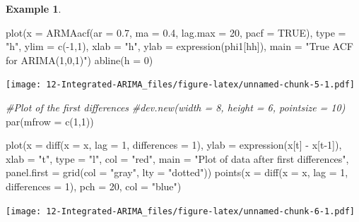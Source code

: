 \documentclass[
]{book}
\newenvironment{Shaded}{\begin{snugshade}}{\end{snugshade}}
\newcommand{\AttributeTok}[1]{\textcolor[rgb]{0.77,0.63,0.00}{#1}}
\newcommand{\CommentTok}[1]{\textcolor[rgb]{0.56,0.35,0.01}{\textit{#1}}}
\newcommand{\ConstantTok}[1]{\textcolor[rgb]{0.00,0.00,0.00}{#1}}
\newcommand{\DecValTok}[1]{\textcolor[rgb]{0.00,0.00,0.81}{#1}}
\newcommand{\FloatTok}[1]{\textcolor[rgb]{0.00,0.00,0.81}{#1}}
\newcommand{\FunctionTok}[1]{\textcolor[rgb]{0.00,0.00,0.00}{#1}}
\newcommand{\NormalTok}[1]{#1}
\newcommand{\OtherTok}[1]{\textcolor[rgb]{0.56,0.35,0.01}{#1}}
\newcommand{\SpecialCharTok}[1]{\textcolor[rgb]{0.00,0.00,0.00}{#1}}
\newcommand{\StringTok}[1]{\textcolor[rgb]{0.31,0.60,0.02}{#1}}
\theoremstyle{definition}
\theoremstyle{definition}
\newtheorem{example}{Example}[chapter]
\theoremstyle{definition}
\theoremstyle{definition}
\theoremstyle{remark}
\begin{document}
\begin{example}
\begin{Shaded}
\begin{Highlighting}[]
\FunctionTok{plot}\NormalTok{(}\AttributeTok{x =} \FunctionTok{ARMAacf}\NormalTok{(}\AttributeTok{ar =} \FloatTok{0.7}\NormalTok{, }\AttributeTok{ma =} \FloatTok{0.4}\NormalTok{, }\AttributeTok{lag.max =} \DecValTok{20}\NormalTok{, pacf }
      \OtherTok{=} \ConstantTok{TRUE}\NormalTok{), }\AttributeTok{type =} \StringTok{"h"}\NormalTok{, }\AttributeTok{ylim =} \FunctionTok{c}\NormalTok{(}\SpecialCharTok{{-}}\DecValTok{1}\NormalTok{,}\DecValTok{1}\NormalTok{), }\AttributeTok{xlab =} \StringTok{"h"}\NormalTok{, ylab }
      \OtherTok{=} \FunctionTok{expression}\NormalTok{(phi1[hh]), }\AttributeTok{main =} \StringTok{"True ACF for }
\StringTok{      ARIMA(1,0,1)"}\NormalTok{)}
\FunctionTok{abline}\NormalTok{(}\AttributeTok{h =} \DecValTok{0}\NormalTok{)}
\end{Highlighting}
\end{Shaded}

\texttt{[image: 12-Integrated-ARIMA\_files/figure-latex/unnamed-chunk-5-1.pdf]}

\begin{Shaded}
\begin{Highlighting}[]
\CommentTok{\#Plot of the first differences}
\CommentTok{\#dev.new(width = 8, height = 6, pointsize = 10)  }
\FunctionTok{par}\NormalTok{(}\AttributeTok{mfrow =} \FunctionTok{c}\NormalTok{(}\DecValTok{1}\NormalTok{,}\DecValTok{1}\NormalTok{))}

\FunctionTok{plot}\NormalTok{(}\AttributeTok{x =} \FunctionTok{diff}\NormalTok{(}\AttributeTok{x =}\NormalTok{ x, }\AttributeTok{lag =} \DecValTok{1}\NormalTok{, }\AttributeTok{differences =} \DecValTok{1}\NormalTok{), }\AttributeTok{ylab =} 
     \FunctionTok{expression}\NormalTok{(x[t] }\SpecialCharTok{{-}}\NormalTok{ x[t}\DecValTok{{-}1}\NormalTok{]), }\AttributeTok{xlab =} \StringTok{"t"}\NormalTok{, }\AttributeTok{type =} \StringTok{"l"}\NormalTok{, col }
      \OtherTok{=} \StringTok{"red"}\NormalTok{, }\AttributeTok{main =}  \StringTok{"Plot of data after first }
\StringTok{      differences"}\NormalTok{, }\AttributeTok{panel.first =} \FunctionTok{grid}\NormalTok{(}\AttributeTok{col =} \StringTok{"gray"}\NormalTok{, }\AttributeTok{lty =} 
     \StringTok{"dotted"}\NormalTok{))}
\FunctionTok{points}\NormalTok{(}\AttributeTok{x =} \FunctionTok{diff}\NormalTok{(}\AttributeTok{x =}\NormalTok{ x, }\AttributeTok{lag =} \DecValTok{1}\NormalTok{, }\AttributeTok{differences =} \DecValTok{1}\NormalTok{), }\AttributeTok{pch =} 
     \DecValTok{20}\NormalTok{, }\AttributeTok{col =} \StringTok{"blue"}\NormalTok{)}
\end{Highlighting}
\end{Shaded}

\texttt{[image: 12-Integrated-ARIMA\_files/figure-latex/unnamed-chunk-6-1.pdf]}
\end{example}
\end{document}
